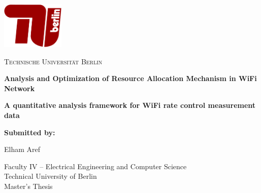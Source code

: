 
\begin{titlepage}
  \begin{center}
	  


	\centering
	\includegraphics[width=3cm]{figures/tub.pdf}\\
	\vspace{0.8em}
	\LARGE 

	\textsc{Technische Universit\"at Berlin}

    \vspace{1cm}

    \sffamily \LARGE \textbf{Analysis and Optimization of Resource Allocation Mechanism in WiFi Network}

    \vspace{1cm}

    \sffamily \Large \textbf{A quantitative analysis framework for WiFi rate control measurement data}

    \vspace{1.5cm}


    \large \textbf{Submitted by:}

    \vspace{.1cm}

    \large Elham Aref

    \vspace{.8cm}



    \normalsize Faculty  IV -- Electrical Engineering and Computer Science\\
    \normalsize Technical University of Berlin\\
    \vspace{.1cm}
   \normalsize  Master's Thesis\\


\end{center}
\end{titlepage}
